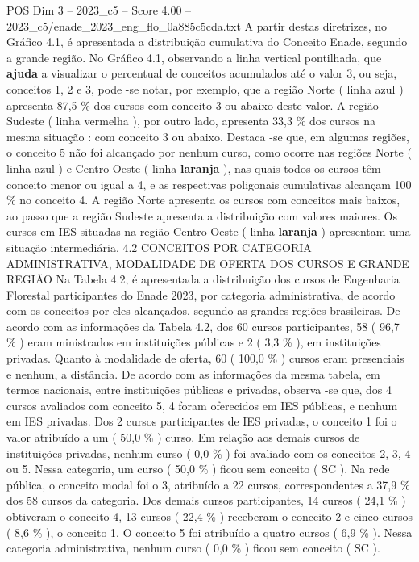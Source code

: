 \begin{textsample}{POS Dim 3 – 2023\_c5 – Score 4.00 – 2023\_c5/enade\_2023\_eng\_flo\_0a885c5cda.txt}
A partir destas diretrizes, no Gráfico 4.1, é apresentada a distribuição cumulativa do Conceito Enade, segundo a grande região.
No Gráfico 4.1, observando a linha vertical pontilhada, que \textbf{ajuda} a visualizar o percentual de conceitos acumulados até o valor 3, ou seja, conceitos 1, 2 e 3, pode -se notar, por exemplo, que a região Norte ( linha azul ) apresenta 87,5 \% dos cursos com conceito 3 ou abaixo deste valor.
A região Sudeste ( linha vermelha ), por outro lado, apresenta 33,3 \% dos cursos na mesma situação : com conceito 3 ou abaixo.
Destaca -se que, em algumas regiões, o conceito 5 não foi alcançado por nenhum curso, como ocorre nas regiões Norte ( linha azul ) e Centro-Oeste ( linha \textbf{laranja} ), nas quais todos os cursos têm conceito menor ou igual a 4, e as respectivas poligonais cumulativas alcançam 100 \% no conceito 4.
A região Norte apresenta os cursos com conceitos mais baixos, ao passo que a região Sudeste apresenta a distribuição com valores maiores.
Os cursos em IES situadas na região Centro-Oeste ( linha \textbf{laranja} ) apresentam uma situação intermediária. 4.2 CONCEITOS POR CATEGORIA ADMINISTRATIVA, MODALIDADE DE OFERTA DOS CURSOS E GRANDE REGIÃO Na Tabela 4.2, é apresentada a distribuição dos cursos de Engenharia Florestal participantes do Enade 2023, por categoria administrativa, de acordo com os conceitos por eles alcançados, segundo as grandes regiões brasileiras.
De acordo com as informações da Tabela 4.2, dos 60 cursos participantes, 58 ( 96,7 \% ) eram ministrados em instituições públicas e 2 ( 3,3 \% ), em instituições privadas.
Quanto à modalidade de oferta, 60 ( 100,0 \% ) cursos eram presenciais e nenhum, a distância.
De acordo com as informações da mesma tabela, em termos nacionais, entre instituições públicas e privadas, observa -se que, dos 4 cursos avaliados com conceito 5, 4 foram oferecidos em IES públicas, e nenhum em IES privadas.
Dos 2 cursos participantes de IES privadas, o conceito 1 foi o valor atribuído a um ( 50,0 \% ) curso.
Em relação aos demais cursos de instituições privadas, nenhum curso ( 0,0 \% ) foi avaliado com os conceitos 2, 3, 4 ou 5.
Nessa categoria, um curso ( 50,0 \% ) ficou sem conceito ( SC ).
Na rede pública, o conceito modal foi o 3, atribuído a 22 cursos, correspondentes a 37,9 \% dos 58 cursos da categoria.
Dos demais cursos participantes, 14 cursos ( 24,1 \% ) obtiveram o conceito 4, 13 cursos ( 22,4 \% ) receberam o conceito 2 e cinco cursos ( 8,6 \% ), o conceito 1.
O conceito 5 foi atribuído a quatro cursos ( 6,9 \% ).
Nessa categoria administrativa, nenhum curso ( 0,0 \% ) ficou sem conceito ( SC ).

\end{textsample}

